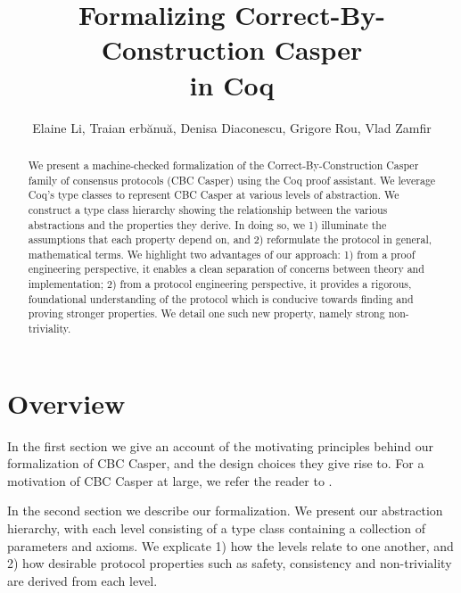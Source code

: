 \documentclass[runningheads]{llncs}
\begin{document}
	
\title{Formalizing Correct-By-Construction Casper \\ in Coq}

\author{Elaine Li, Traian erbănuă, Denisa Diaconescu, Grigore Rou, Vlad Zamfir}

\maketitle

\begin{abstract}
We present a machine-checked formalization of the Correct-By-Construction Casper family of consensus protocols (CBC Casper) using the Coq proof assistant.
We leverage Coq's type classes to represent CBC Casper at various levels of abstraction.
We construct a type class hierarchy showing the relationship between the various abstractions and the properties they derive.
In doing so, we 1) illuminate the assumptions that each property depend on, and 2) reformulate the protocol in general, mathematical terms.
We highlight two advantages of our approach: 1) from a proof engineering perspective, it enables a clean separation of concerns between theory and implementation; 2) from a protocol engineering perspective, it provides a rigorous, foundational understanding of the protocol which is conducive towards finding and proving stronger properties. We detail one such new property, namely strong non-triviality.
\end{abstract}

\section{Overview}
In the first section we give an account of the motivating principles behind our formalization of CBC Casper, and the design choices they give rise to. For a motivation of CBC Casper at large, we refer the reader to \cite{CBCfull}.

In the second section we describe our formalization. We present our abstraction hierarchy, with each level consisting of a type class containing a collection of parameters and axioms. We explicate 1) how the levels relate to one another, and 2) how desirable protocol properties such as safety, consistency and non-triviality are derived from each level.
\end{document}
